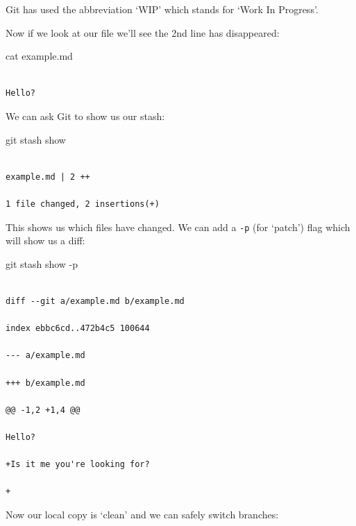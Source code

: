 \documentclass[
  letterpaper,
  DIV=11,
  numbers=noendperiod]{scrartcl}
\newenvironment{Shaded}{\begin{snugshade}}{\end{snugshade}}
\newcommand{\NormalTok}[1]{\textcolor[rgb]{0.00,0.23,0.31}{#1}}
\newcommand{\SpecialCharTok}[1]{\textcolor[rgb]{0.37,0.37,0.37}{#1}}
\begin{document}
Git has used the abbreviation `WIP' which stands for `Work In Progress'.

Now if we look at our file we'll see the 2nd line has disappeared:

\begin{Shaded}
\begin{Highlighting}[]
\NormalTok{cat example.md}
\end{Highlighting}
\end{Shaded}

\begin{verbatim}

Hello?
\end{verbatim}

We can ask Git to show us our stash:

\begin{Shaded}
\begin{Highlighting}[]
\NormalTok{git stash show}
\end{Highlighting}
\end{Shaded}

\begin{verbatim}

example.md | 2 ++

1 file changed, 2 insertions(+)
\end{verbatim}

This shows us which files have changed. We can add a \texttt{-p} (for
`patch') flag which will show us a diff:

\begin{Shaded}
\begin{Highlighting}[]
\NormalTok{git stash show }\SpecialCharTok{{-}}\NormalTok{p}
\end{Highlighting}
\end{Shaded}

\begin{verbatim}

diff --git a/example.md b/example.md

index ebbc6cd..472b4c5 100644

--- a/example.md

+++ b/example.md

@@ -1,2 +1,4 @@

Hello?

+Is it me you're looking for?

+
\end{verbatim}

Now our local copy is `clean' and we can safely switch branches:
\end{document}
